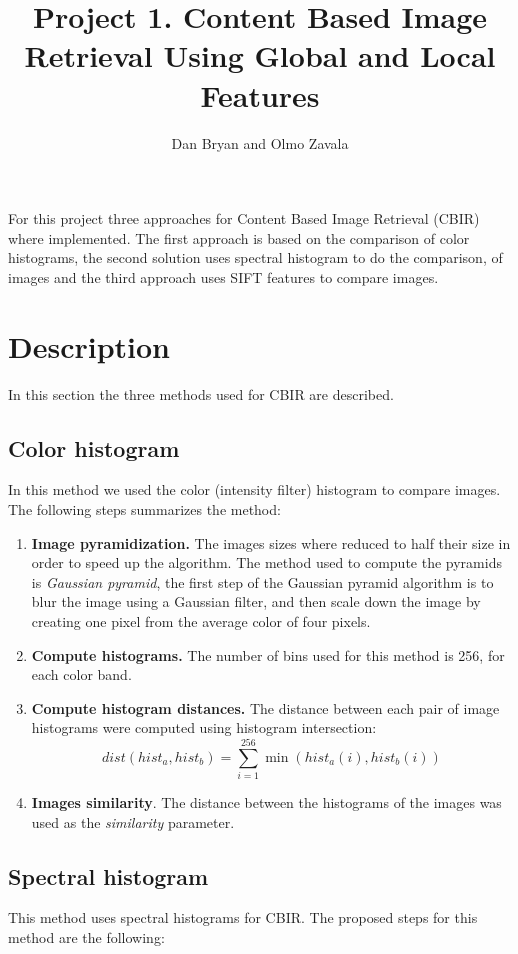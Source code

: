 \documentclass[a4paper,12pt]{article}
\title{Project 1. Content Based Image Retrieval Using Global and Local Features}
\author{Dan Bryan and Olmo Zavala}
\begin{document}
\maketitle

For this project three approaches for Content Based Image Retrieval  (CBIR)
where implemented. The first approach is based on the comparison of color 
histograms, the second solution uses spectral histogram to do the comparison,
of images and the third approach uses SIFT features to compare images. 

\section{Description}
In this section the three methods used for CBIR are described. 

\subsection{Color histogram}
\label{sec_colorhist}
In this method we used the color (intensity filter) histogram  to 
compare images. The following steps summarizes the method:
\begin{enumerate}
    \item \textbf{Image pyramidization. } The images sizes where reduced
        to half their size in order to speed up the algorithm. The method used
        to compute the pyramids is \emph{Gaussian pyramid}, the first
        step of the Gaussian pyramid algorithm is to blur the image 
        using a Gaussian filter, and then scale down the image by 
        creating one pixel from the average color of four pixels.
    \item \textbf{Compute histograms.} The number of bins used
        for this method is 256, for each color band.
    \item \textbf{Compute histogram distances.} The distance between
        each pair of image histograms were computed using histogram intersection:
        \begin{equation}
            dist(hist_a,hist_b) = \sum_{i=1}^{256} \min( hist_a(i), hist_b(i))
        \end{equation}
    \item \textbf{Images similarity}. The distance between the histograms
        of the images was used as the \emph{similarity} parameter. 
\end{enumerate}

\subsection{Spectral histogram}
\label{sec_spechist}
This method uses spectral histograms for CBIR. The proposed steps
for this method are the following:
\end{document}
